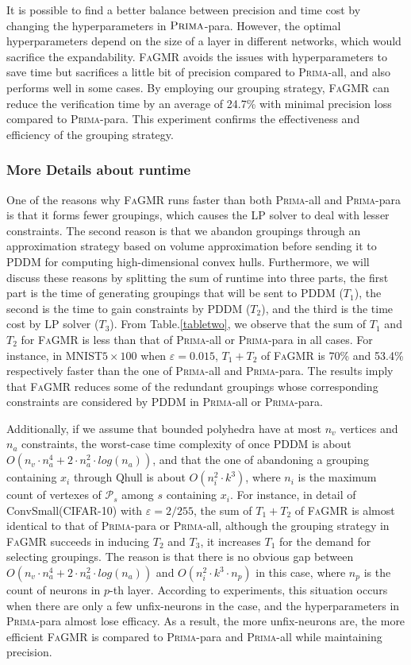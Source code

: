 \documentclass[runningheads]{llncs}
\newcommand{\ourtool}{\textsc{FaGMR}\xspace}
\newcommand{\prima}{\textsc{Prima}\xspace}
\newcommand{\mnist}{MNIST\xspace}
\newcommand{\cifar}{CIFAR-10\xspace}
\begin{document}
It is possible to find a better balance between precision and time cost by changing the hyperparameters in $\prima$-para. However, the optimal hyperparameters depend on the size of a layer in different networks, which would sacrifice the expandability.
\ourtool avoids the issues with hyperparameters to save time but sacrifices a little bit of precision compared to \prima-all, and also performs well in some cases.
By employing our grouping strategy, \ourtool can reduce the verification time
by an average of 24.7\% with minimal precision loss compared to \prima-para.
This experiment confirms the effectiveness and efficiency of the grouping strategy.
%
%
%
\subsubsection{More Details about runtime}
One of the reasons why \ourtool runs faster than both \prima-all and \prima-para is that it forms fewer groupings, which causes the LP solver to deal with lesser constraints.
The second reason is that we abandon groupings through an
approximation strategy based on volume approximation before sending it to PDDM for computing high-dimensional convex hulls.
Furthermore, we will discuss these reasons by splitting the sum of runtime into three parts, the first part is the time of generating groupings that will be sent to PDDM ($T_{1}$), the second is the time to gain constraints by PDDM ($T_{2}$), and the third is the time cost by LP solver ($T_{3}$).
From Table.\ref{tabletwo}, we observe that the sum of $T_{1}$ and $T_{2}$ for \ourtool is less than that of \prima-all or \prima-para in all cases. For instance, in \mnist $5\times100$ when $\varepsilon = 0.015$, $T_{1}+T_{2}$ of \ourtool is 70\% and 53.4\% respectively faster than the one of
\prima-all and \prima-para. The results imply that \ourtool reduces some of the redundant groupings whose corresponding constraints are considered by PDDM in \prima-all or \prima-para. 

Additionally, if we assume that bounded polyhedra have at most $n_{v}$ vertices and $n_{a}$ constraints,  the worst-case time complexity of once PDDM is about $O(n_{v}\cdot n_{a}^{4}+2 \cdot n_{a}^{2} \cdot log(n_{a}))$,
and that the one of abandoning a grouping containing $x_{i}$ through Qhull is about
$O(n^{2}_{i} \cdot k^{3})$, where $n_{i}$ is the maximum count of vertexes of $\mathcal{P}_{s}$ among $s$ containing $x_{i}$.
For instance, in detail of ConvSmall(\cifar) with $\varepsilon=2/255$, the sum of $T_{1}+T_{2}$ of \ourtool is almost identical to that of \prima-para or \prima-all, although the grouping strategy in \ourtool succeeds in inducing $T_{2}$ and $T_{3}$, it increases $T_{1}$ for the demand for selecting groupings. The reason is that there is no obvious gap between $O(n_{v}\cdot n_{a}^{4}+2\cdot n_{a}^{2}\cdot log(n_{a}))$ and $O(n_{i}^{2}\cdot k^{3} \cdot n_{p})$ in this case, where $n_{p}$ is the count of neurons in $p$-th layer. According to experiments, this situation occurs when there are only a few unfix-neurons in the case, and the hyperparameters in \prima-para almost lose efficacy. As a result, the more unfix-neurons are, the more efficient \ourtool is compared to \prima-para and \prima-all while maintaining precision.
\end{document}
